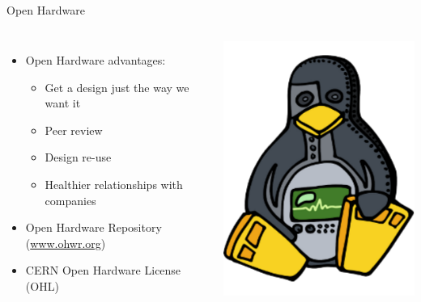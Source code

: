\documentclass[compress,red]{beamer}
\begin{document}
\subsection{}
\begin{frame}{Open Hardware}

  \begin{columns}[c]

      
      \begin{itemize}
        \item Open Hardware advantages:
         \begin{itemize}
            \item Get a design just the way we want it
            \item Peer review
	     \item Design re-use
	     \item Healthier relationships with companies
	\end{itemize}
        \item Open Hardware Repository (\href{http://ohwr.org}{www.ohwr.org})
	\item CERN Open Hardware License (OHL)
      \end{itemize}


    \begin{center}
      \includegraphics[width=1.0\textwidth]{ohwr/ohr_logo.pdf}  
    \end{center}


\end{columns}
\end{frame}
\end{document}
